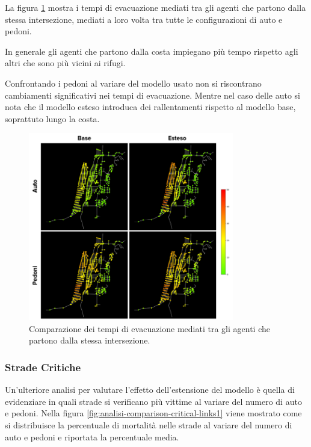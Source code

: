 \pagebreak

La figura \ref{fig:analisi-comparison-ev-times-map} mostra i tempi di evacuazione mediati tra gli agenti che partono dalla stessa intersezione,
mediati a loro volta tra tutte le configurazioni di auto e pedoni.

In generale gli agenti che partono dalla costa impiegano più tempo rispetto agli altri che sono più vicini ai rifugi.

Confrontando i pedoni al variare del modello usato non si riscontrano cambiamenti significativi nei tempi di evacuazione.
Mentre nel caso delle auto si nota che il modello esteso introduca dei rallentamenti rispetto al modello base, soprattuto lungo la costa.

\begin{figure}[ht]
    \centering
    \includegraphics[width=0.8\textwidth]{images/analisi/comparison-evtimes-map.png}
    \caption{Comparazione dei tempi di evacuazione mediati tra gli agenti che partono dalla stessa intersezione. }
    \label{fig:analisi-comparison-ev-times-map}
\end{figure}

\pagebreak

\subsubsection*{Strade Critiche}
Un'ulteriore analisi per valutare l'effetto dell'estensione del modello è quella di evidenziare in quali strade si verificano 
più vittime al variare del numero di auto e pedoni. 
%
Nella figura \ref{fig:analisi-comparison-critical-links1} viene mostrato come si distribuisce la percentuale di mortalità nelle strade 
al variare del numero di auto e pedoni e riportata la percentuale media. 

